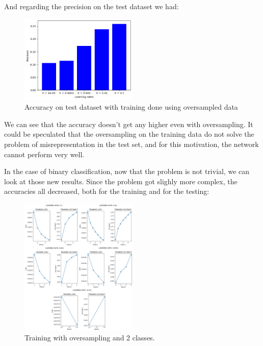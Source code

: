 \documentclass{article}
\begin{document}
And regarding the precision on the test dataset we had:

\begin{figure}[h!]
    \centering
    \includegraphics[width=0.5\textwidth]{precision_oversampling_nn.png}
    \caption{\label{fig:acc_oversampling}Accuracy on test dataset with training done using oversampled data}
\end{figure}

We can see that the accuracy doesn't get any higher even with oversampling. It could be speculated that the oversampling on the training data
do not solve the problem of misrepresentation in the test set, and for this motivation, the network cannot perform very well.

In the case of binary classification, now that the problem is not trivial, we can look at those new results. Since the problem got slighly more complex,
the accuracies all decreased, both for the training and for the testing:

\begin{figure}[h!]
    \centering
    \includegraphics[width=0.5\textwidth]{binary_nn_oversampling.png}
    \caption{\label{fig:binary_train_oversampling}Training with oversampling and 2 classes.}
\end{figure}
\end{document}
